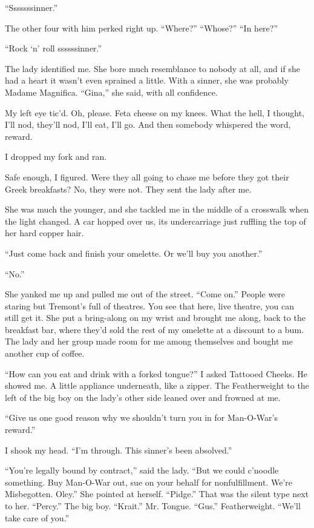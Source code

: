 ``Sssssssinner.''

The other four with him perked right up. ``Where?'' ``Whose?'' ``In here?''

``Rock `n' roll ssssssinner.''

The lady identified me. She bore much resemblance to nobody at all, and if she had a heart it wasn't even sprained a little. With a sinner, she was probably Madame Magnifica. ``Gina,'' she said, with all confidence.

My left eye tic'd. Oh, please. Feta cheese on my knees. What the hell, I thought, I'll nod, they'll nod, I'll eat, I'll go. And then somebody whispered the word, reward.

I dropped my fork and ran.

Safe enough, I figured. Were they all going to chase me before they got their Greek breakfasts? No, they were not. They sent the lady after me.

She was much the younger, and she tackled me in the middle of a crosswalk when the light changed. A car hopped over us, its undercarriage just ruffling the top of her hard copper hair.

``Just come back and finish your omelette. Or we'll buy you another.''

``No.''

She yanked me up and pulled me out of the street. ``Come on.'' People were staring but Tremont's full of theatres. You see that here, live theatre, you can still get it. She put a bring-along on my wrist and brought me along, back to the breakfast bar, where they'd sold the rest of my omelette at a discount to a bum. The lady and her group made room for me among themselves and bought me another cup of coffee.

``How can you eat and drink with a forked tongue?'' I asked Tattooed Cheeks. He showed me. A little appliance underneath, like a zipper. The Featherweight to the left of the big boy on the lady's other side leaned over and frowned at me.

``Give us one good reason why we shouldn't turn you in for Man-O-War's reward.''

I shook my head. ``I'm through. This sinner's been absolved.''

``You're legally bound by contract,'' said the lady. ``But we could c'noodle something. Buy Man-O-War out, sue on your behalf for nonfulfillment. We're Misbegotten. Oley.'' She pointed at herself. ``Pidge.'' That was the silent type next to her. ``Percy.'' The big boy. ``Krait.'' Mr. Tongue. ``Gus.'' Featherweight. ``We'll take care of you.''

